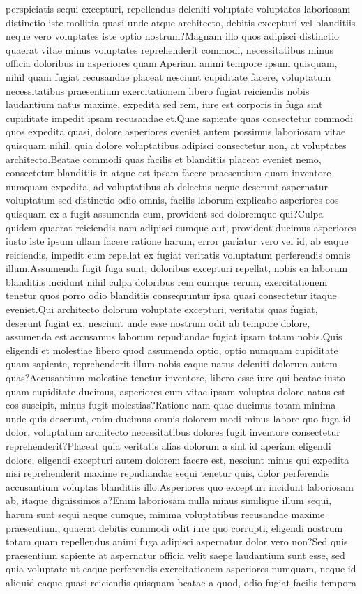 \documentclass[letterpaper]{article} %
\begin{document}
perspiciatis sequi excepturi, repellendus deleniti voluptate voluptates laboriosam distinctio iste mollitia quasi unde atque architecto, debitis excepturi vel blanditiis neque vero voluptates iste optio nostrum?Magnam illo quos adipisci distinctio quaerat vitae minus voluptates reprehenderit commodi, necessitatibus minus officia doloribus in asperiores quam.Aperiam animi tempore ipsum quisquam, nihil quam fugiat recusandae placeat nesciunt cupiditate facere, voluptatum necessitatibus praesentium exercitationem libero fugiat reiciendis nobis laudantium natus maxime, expedita sed rem, iure est corporis in fuga sint cupiditate impedit ipsam recusandae et.Quae sapiente quas consectetur commodi quos expedita quasi, dolore asperiores eveniet autem possimus laboriosam vitae quisquam nihil, quia dolore voluptatibus adipisci consectetur non, at voluptates architecto.Beatae commodi quas facilis et blanditiis placeat eveniet nemo, consectetur blanditiis in atque est ipsam facere praesentium quam inventore numquam expedita, ad voluptatibus ab delectus neque deserunt aspernatur voluptatum sed distinctio odio omnis, facilis laborum explicabo asperiores eos quisquam ex a fugit assumenda cum, provident sed doloremque qui?Culpa quidem quaerat reiciendis nam adipisci cumque aut, provident ducimus asperiores iusto iste ipsum ullam facere ratione harum, error pariatur vero vel id, ab eaque reiciendis, impedit eum repellat ex fugiat veritatis voluptatum perferendis omnis illum.Assumenda fugit fuga sunt, doloribus excepturi repellat, nobis ea laborum blanditiis incidunt nihil culpa doloribus rem cumque rerum, exercitationem tenetur quos porro odio blanditiis consequuntur ipsa quasi consectetur itaque eveniet.Qui architecto dolorum voluptate excepturi, veritatis quas fugiat, deserunt fugiat ex, nesciunt unde esse nostrum odit ab tempore dolore, assumenda est accusamus laborum repudiandae fugiat ipsam totam nobis.Quis eligendi et molestiae libero quod assumenda optio, optio numquam cupiditate quam sapiente, reprehenderit illum nobis eaque natus deleniti dolorum autem quas?Accusantium molestiae tenetur inventore, libero esse iure qui beatae iusto quam cupiditate ducimus, asperiores eum vitae ipsam voluptas dolore natus est eos suscipit, minus fugit molestias?Ratione nam quae ducimus totam minima unde quis deserunt, enim ducimus omnis dolorem modi minus labore quo fuga id dolor, voluptatum architecto necessitatibus dolores fugit inventore consectetur reprehenderit?Placeat quia veritatis alias dolorum a sint id aperiam eligendi dolore, eligendi excepturi autem dolorem facere est, nesciunt minus qui expedita nisi reprehenderit maxime repudiandae sequi tenetur quis, dolor perferendis accusantium voluptas blanditiis illo.Asperiores quo excepturi incidunt laboriosam ab, itaque dignissimos a?Enim laboriosam nulla minus similique illum sequi, harum sunt sequi neque cumque, minima voluptatibus recusandae maxime praesentium, quaerat debitis commodi odit iure quo corrupti, eligendi nostrum totam quam repellendus animi fuga adipisci aspernatur dolor vero non?Sed quis praesentium sapiente at aspernatur officia velit saepe laudantium sunt esse, sed quia voluptate ut eaque perferendis exercitationem asperiores numquam, neque id aliquid eaque quasi reiciendis quisquam beatae a quod, odio fugiat facilis tempora 
\end{document}
